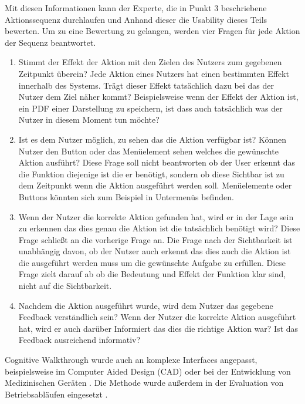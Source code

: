 \documentclass[draft=false
              ,paper=a4
              ,twoside=false
              ,fontsize=11pt
              ,headsepline
              ,BCOR10mm
              ,DIV11
              ]{scrbook}
\begin{document}
Mit diesen Informationen kann der Experte, die in Punkt 3 beschriebene Aktionssequenz durchlaufen und Anhand dieser die Usability dieses Teils bewerten. Um zu eine Bewertung zu gelangen, werden vier Fragen für jede Aktion der Sequenz beantwortet.

\begin{enumerate}
  \item Stimmt der Effekt der Aktion mit den Zielen des Nutzers zum gegebenen Zeitpunkt überein? Jede Aktion eines Nutzers hat einen bestimmten Effekt innerhalb des Systems. Trägt dieser Effekt tatsächlich dazu bei das der Nutzer dem Ziel näher kommt? Beispielsweise wenn der Effekt der Aktion ist, ein PDF einer Darstellung zu speichern, ist dass auch tatsächlich was der Nutzer in diesem Moment tun möchte?
  \item Ist es dem Nutzer möglich, zu sehen das die Aktion verfügbar ist? Können Nutzer den Button oder das Menüelement sehen welches die gewünschte Aktion ausführt? Diese Frage soll nicht beantworten ob der User erkennt das die Funktion diejenige ist die er benötigt, sondern ob diese Sichtbar ist zu dem Zeitpunkt wenn die Aktion ausgeführt werden soll. Menüelemente oder Buttons könnten sich zum Beispiel in Untermenüs befinden.
  \item Wenn der Nutzer die korrekte Aktion gefunden hat, wird er in der Lage sein zu erkennen das dies genau die Aktion ist die tatsächlich benötigt wird? Diese Frage schließt an die vorherige Frage an. Die Frage nach der Sichtbarkeit ist unabhängig davon, ob der Nutzer auch erkennt das dies auch die Aktion ist die ausgeführt werden muss um die gewünschte Aufgabe zu erfüllen. Diese Frage zielt darauf ab ob die Bedeutung und Effekt der Funktion klar sind, nicht auf die Sichtbarkeit.
  \item Nachdem die Aktion ausgeführt wurde, wird dem Nutzer das gegebene Feedback verständlich sein? Wenn der Nutzer die korrekte Aktion ausgeführt hat, wird er auch darüber Informiert das dies die richtige Aktion war? Ist das Feedback ausreichend informativ? 
\end{enumerate}

Cognitive Walkthrough wurde auch an komplexe Interfaces angepasst, beispielsweise im Computer Aided Design (CAD) \cite{wharton_applying_1992} oder bei der Entwicklung von Medizinischen Geräten \cite{bliga_ard_enhanced_2013}. Die Methode wurde außerdem in der Evaluation von Betriebsabläufen eingesetzt \cite{novick_using_1999}.
\end{document}
